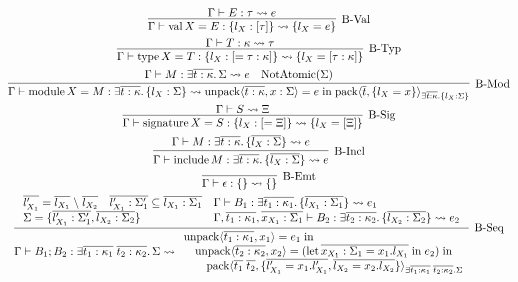 \begin{gather*}
  \infer[\text{B-Val}]{\Gamma \vdash \symval X = E: \{l_X: [\tau]\} \elaborate \{l_X = e\}}{
    \Gamma \vdash E: \tau \elaborate e
  }
  \\
  \infer[\text{B-Typ}]{\Gamma \vdash \symtype X = T: \{l_X: [= \tau: \kappa]\} \elaborate \{l_X = [\tau: \kappa]\}}{
    \Gamma \vdash T: \kappa \elaborate \tau
  }
  \\
  \infer[\text{B-Mod}]{\Gamma \vdash \symmodule X = M: \exists \overline{t: \kappa}\ldotp \{l_X: \Sigma\} \elaborate \symunpack\langle \overline{t: \kappa}, x: \Sigma\rangle = e \symin \sympack\langle \overline{t}, \{l_X = x\}\rangle_{\exists \overline{t: \kappa}\ldotp \{l_X: \Sigma\}}}{
    \Gamma \vdash M: \exists \overline{t: \kappa}\ldotp \Sigma \elaborate e
    &
    \symNotAtomic(\Sigma)
  }
  \\
  \infer[\text{B-Sig}]{\Gamma \vdash \symsignature X = S: \{l_X: [= \Xi]\} \elaborate \{l_X = [\Xi]\}}{
    \Gamma \vdash S \elaborate \Xi
  }
  \\
  \infer[\text{B-Incl}]{\Gamma \vdash \syminclude M: \exists \overline{t: \kappa}\ldotp \{\overline{l_X: \Sigma}\} \elaborate e}{
    \Gamma \vdash M: \exists \overline{t: \kappa}\ldotp \{\overline{l_X: \Sigma}\} \elaborate e
  }
  \\
  \infer[\text{B-Emt}]{\Gamma \vdash \epsilon: \{\} \elaborate \{\}}{}
  \\
  \infer[\text{B-Seq}]{
    \Gamma \vdash B_1; B_2: \exists \overline{t_1: \kappa_1}\; \overline{t_2: \kappa_2}\ldotp \Sigma \elaborate
    \begin{array}{l}
      \symunpack\langle \overline{t_1: \kappa_1}, x_1\rangle = e_1 \symin \\
      \hspace{1em}\symunpack\langle \overline{t_2: \kappa_2}, x_2\rangle = (\symlet \overline{x_{X_1}: \Sigma_1 = x_1.l_{X_1}} \symin e_2) \symin \\
      \hspace{2em}\sympack\langle \overline{t_1}\; \overline{t_2}, \{\overline{l'_{X_1} = x_1.l'_{X_1}}, \overline{l_{X_2} = x_2.l_{X_2}}\}\rangle_{
        \exists \overline{t_1: \kappa_1}\; \overline{t_2: \kappa_2}\ldotp \Sigma
      }
    \end{array}
  }{
    \begin{array}{lll}
      \overline{l'_{X_1}} = \overline{l_{X_1}} \rcomplement \overline{l_{X_2}}
      &
      \overline{l'_{X_1}: \Sigma'_1} \subseteq \overline{l_{X_1}: \Sigma_1}
      &
      \Gamma \vdash B_1: \exists \overline{t_1: \kappa_1}\ldotp \{\overline{l_{X_1}: \Sigma_1}\} \elaborate e_1
      \\
      \multicolumn{2}{l}{\Sigma = \{\overline{l'_{X_1}: \Sigma'_1}, \overline{l_{X_2}: \Sigma_2}\}}
      &
      \Gamma, \overline{t_1: \kappa_1}, \overline{x_{X_1}: \Sigma_1} \vdash B_2: \exists \overline{t_2: \kappa_2}\ldotp \{\overline{l_{X_2}: \Sigma_2}\} \elaborate e_2
    \end{array}
  }
\end{gather*}

